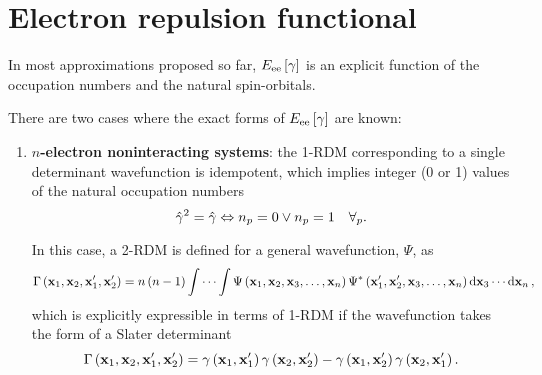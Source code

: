 \section{Electron repulsion functional} %
\label{sub:Electron-electron functionals}

In most approximations proposed so far, $E_{\text{ee}} \left[ \gamma \right]$
is an explicit function of the occupation numbers and the natural spin-orbitals. 

There are two cases where the exact forms of $E_{\text{ee}} \left[ \gamma \right]$ are known:
\begin{enumerate}
    \item \textbf{$n$-electron noninteracting systems}: the 1-RDM corresponding
        to a single determinant wavefunction is idempotent, which implies integer
        (0 or 1) values of the natural occupation numbers 
        \begin{equation}
            \hat{\gamma}^{2} = \hat{\gamma}
            \Leftrightarrow
            n_p = 0  \vee n_p = 1
            \quad \forall_{p}
            .
        \end{equation}

        In this case, a 2-RDM is defined for a general wavefunction, $\Psi$, as 
        \begin{equation}
            \Gamma \left( \boldsymbol{\mathrm{x}}_1, \boldsymbol{\mathrm{x}}_2, \boldsymbol{\mathrm{x}}_1^{\prime}, \boldsymbol{\mathrm{x}}_2^{\prime} \right)
            =
            n\left( n - 1 \right) \idotsint
            \Psi \left( \boldsymbol{\mathrm{x}}_1, \boldsymbol{\mathrm{x}}_2, \boldsymbol{\mathrm{x}}_3, \ldots,  \boldsymbol{\mathrm{x}}_n \right)
            \Psi^{*} \left( \boldsymbol{\mathrm{x}}_1^{\prime}, \boldsymbol{\mathrm{x}}_2^{\prime}, \boldsymbol{\mathrm{x}}_3, \ldots,  \boldsymbol{\mathrm{x}}_n \right)
            \dd{ \boldsymbol{\mathrm{x}}_3} \cdots \dd{ \boldsymbol{\mathrm{x}}_n}
            ,
        \end{equation}
        which is explicitly expressible in terms of 1-RDM if the wavefunction takes
        the form of a Slater determinant 
        \begin{equation} \label{eq:HF-approximation-sordm-1}
            \Gamma \left( \boldsymbol{\mathrm{x}}_1, \boldsymbol{\mathrm{x}}_2, \boldsymbol{\mathrm{x}}_1^{\prime}, \boldsymbol{\mathrm{x}}_2^{\prime} \right)
            = 
            \gamma \left( \boldsymbol{\mathrm{x}}_1, \boldsymbol{\mathrm{x}}_1^{\prime} \right)
            \gamma \left( \boldsymbol{\mathrm{x}}_2, \boldsymbol{\mathrm{x}}_2^{\prime} \right)
            -
            \gamma \left( \boldsymbol{\mathrm{x}}_1, \boldsymbol{\mathrm{x}}_2^{\prime} \right)
            \gamma \left( \boldsymbol{\mathrm{x}}_2, \boldsymbol{\mathrm{x}}_1^{\prime} \right)
            .
        \end{equation}


\end{enumerate}
